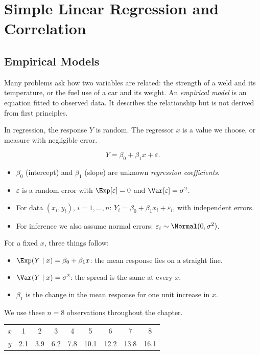 \chapter{Simple Linear Regression and Correlation}

\section{Empirical Models}

Many problems ask how two variables are related: the strength of a weld and its temperature, or the fuel use of a car and its weight. An \emph{empirical model} is an equation fitted to observed data. It describes the relationship but is not derived from first principles.

In regression, the response $Y$ is random. The regressor $x$ is a value we choose, or measure with negligible error.

\begin{definition}
\[ Y=\beta_0+\beta_1x+\varepsilon. \]
\begin{itemize}
  \item $\beta_0$ (intercept) and $\beta_1$ (slope) are unknown \emph{regression coefficients}.
  \item $\varepsilon$ is a random error with $\Exp[\varepsilon]=0$ and $\Var[\varepsilon]=\sigma^2$.
  \item For data $(x_i,y_i)$, $i=1,\dots,n$: $Y_i=\beta_0+\beta_1x_i+\varepsilon_i$, with independent errors.
  \item For inference we also assume normal errors: $\varepsilon_i\sim\Normal(0,\sigma^2)$.
\end{itemize}
\end{definition}

For a fixed $x$, three things follow:
\begin{itemize}
  \item $\Exp(Y\mid x)=\beta_0+\beta_1x$: the mean response lies on a straight line.
  \item $\Var(Y\mid x)=\sigma^2$: the spread is the same at every $x$.
  \item $\beta_1$ is the change in the mean response for one unit increase in $x$.
\end{itemize}

\begin{example}\label{ex:regdata}
We use these $n=8$ observations throughout the chapter.
\begin{center}
\begin{tabular}{c|cccccccc}
\toprule
$x$ & 1 & 2 & 3 & 4 & 5 & 6 & 7 & 8\\
$y$ & 2.1 & 3.9 & 6.2 & 7.8 & 10.1 & 12.2 & 13.8 & 16.1\\
\bottomrule
\end{tabular}
\end{center}
\end{example}

